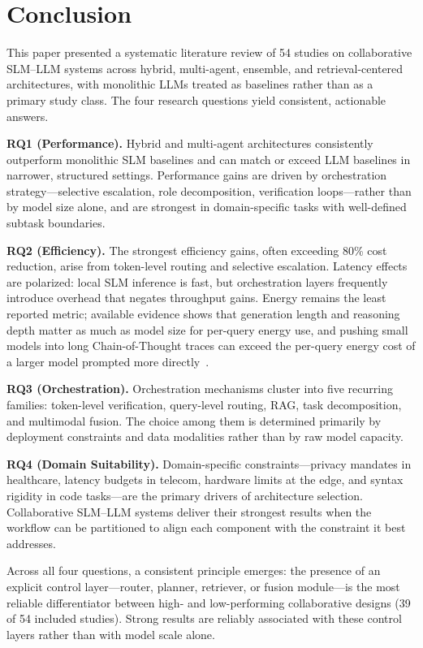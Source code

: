 \section{Conclusion}
\label{sec:conclusion}

This paper presented a systematic literature review of 54 studies on collaborative SLM--LLM systems across hybrid, multi-agent, ensemble, and retrieval-centered architectures, with monolithic LLMs treated as baselines rather than as a primary study class. The four research questions yield consistent, actionable answers.

\textbf{RQ1 (Performance).} Hybrid and multi-agent architectures consistently outperform monolithic SLM baselines and can match or exceed LLM baselines in narrower, structured settings. Performance gains are driven by orchestration strategy---selective escalation, role decomposition, verification loops---rather than by model size alone, and are strongest in domain-specific tasks with well-defined subtask boundaries.

\textbf{RQ2 (Efficiency).} The strongest efficiency gains, often exceeding 80\% cost reduction, arise from token-level routing and selective escalation. Latency effects are polarized: local SLM inference is fast, but orchestration layers frequently introduce overhead that negates throughput gains. Energy remains the least reported metric; available evidence shows that generation length and reasoning depth matter as much as model size for per-query energy use, and pushing small models into long Chain-of-Thought traces can exceed the per-query energy cost of a larger model prompted more directly~\cite{energytoken2025}.

\textbf{RQ3 (Orchestration).} Orchestration mechanisms cluster into five recurring families: token-level verification, query-level routing, RAG, task decomposition, and multimodal fusion. The choice among them is determined primarily by deployment constraints and data modalities rather than by raw model capacity.

\textbf{RQ4 (Domain Suitability).} Domain-specific constraints---privacy mandates in healthcare, latency budgets in telecom, hardware limits at the edge, and syntax rigidity in code tasks---are the primary drivers of architecture selection. Collaborative SLM--LLM systems deliver their strongest results when the workflow can be partitioned to align each component with the constraint it best addresses.

Across all four questions, a consistent principle emerges: the presence of an explicit control layer---router, planner, retriever, or fusion module---is the most reliable differentiator between high- and low-performing collaborative designs (39 of 54 included studies). Strong results are reliably associated with these control layers rather than with model scale alone.

